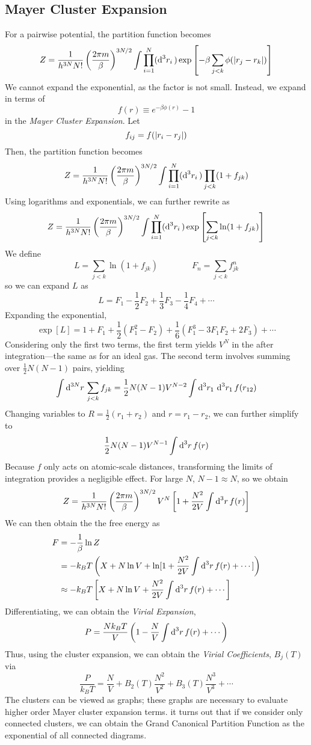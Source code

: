 \subsection{Mayer Cluster Expansion}
For a pairwise potential, the partition function becomes
\begin{equation}
	Z = \frac{1}{h^{3N}N!}\left(\frac{2\pi m}{\beta}\right)^{3N/2}\int\prod_{i=1}^N(\d[3]{r_i})\exp\left[-\beta\sum_{j<k}\phi(\abs{r_j-r_k})\right]
\end{equation}
We cannot expand the exponential, as the factor is not small. Instead, we expand in terms of 
\begin{equation}
	f(r) \equiv e^{-\beta\phi(r)}-1
\end{equation}
in the \emph{Mayer Cluster Expansion}. Let
\[f_{ij} = f(\left|r_i-r_j\right|)\]
Then, the partition function becomes
\[Z = \frac{1}{h^{3N}N!}\left(\frac{2\pi m}{\beta}\right)^{3N/2}\int\prod_{i=1}^N(\d[3]{r_i})\prod_{j<k}(1+f_{jk})\]
Using logarithms and exponentials, we can further rewrite as
\[Z = \frac{1}{h^{3N}N!}\left(\frac{2\pi m}{\beta}\right)^{3N/2}\int\prod_{i=1}^N(\d[3]{r_i})\exp\left[\sum_{j<k}\ln(1+f_{jk})\right]\]
We define
\[L = \sum_{j<k}\ln(1+f_{jk}) \qquad \qquad F_n = \sum_{j<k}f^n_{jk}\]
so we can expand \(L\) as
\[L = F_1-\frac{1}{2}F_2+\frac{1}{3}F_3-\frac{1}{4}F_4+\cdots\] 
Expanding the exponential,
\[\exp[L] = 1+F_1 +\frac{1}{2}\left(F_1^2-F_2\right)+\frac{1}{6}\left(F_1^3-3F_1F_2+2F_3\right)+\cdots\]
Considering only the first two terms, the first term yields \(V^N\) in the after integration---the same as for an ideal gas. The second term involves summing over \(\frac{1}{2}N(N-1)\) pairs, yielding
\[\int\d[3N]{r} \sum_{j<k}f_{jk} = \frac{1}{2}N(N-1)V^{N-2}\int\d[3]{r_1}\d[3]{r_1}f(r_{12})\]
Changing variables to \(R = \frac{1}{2}(r_1+r_2)\) and \(r = r_1-r_2\), we can further simplify to
\[\frac{1}{2}N(N-1)V^{N-1}\int\d[3]{r}f(r)\]
Because \(f\) only acts on atomic-scale distances, transforming the limits of integration provides a negligible effect. For large \(N\), \(N-1\approx N\), so we obtain
\begin{equation}
	Z = \frac{1}{h^{3N}N!}\left(\frac{2\pi m}{\beta}\right)^{3N/2}V^N\left[1+\frac{N^2}{2V}\int\d[3]{r}f(r)\right]
\end{equation}
We can then obtain the the free energy as
\begin{align*}
	F&=-\frac{1}{\beta}\ln Z \\
	 &=-k_BT\left(X+N\ln V +\ln[1+\frac{N^2}{2V}\int\d[3]rf(r)+\cdots]\right)\\
	 &\approx -k_BT	\left[X+N\ln V + \frac{N^2}{2V}\int\d[3]rf(r)+\cdots\right]
\end{align*}
Differentiating, we can obtain the \emph{Virial Expansion},
\[P=\frac{Nk_BT}{V}\left(1-\frac{N}{V}\int\d[3]{r}f(r)+\cdots\right)\]
Thus, using the cluster expansion, we can obtain the \emph{Virial Coefficients}, \(B_j(T)\) via
\[\frac{P}{k_BT} = \frac{N}{V}+B_2(T)\frac{N^2}{V^2}+B_3(T)\frac{N^3}{V^3}+\cdots\]
The clusters can be viewed as graphs; these graphs are necessary to evaluate higher order Mayer cluster expansion terms. it turns out that if we consider only connected clusters, we can obtain the Grand Canonical Partition Function as the exponential of all connected diagrams.
